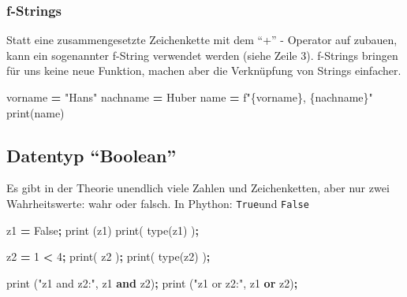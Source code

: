 \documentclass[
  oneside]{book}
\newenvironment{Shaded}{\begin{snugshade}}{\end{snugshade}}
\newcommand{\BuiltInTok}[1]{#1}
\newcommand{\DecValTok}[1]{\textcolor[rgb]{0.00,0.00,0.81}{#1}}
\newcommand{\KeywordTok}[1]{\textcolor[rgb]{0.13,0.29,0.53}{\textbf{#1}}}
\newcommand{\NormalTok}[1]{#1}
\newcommand{\OperatorTok}[1]{\textcolor[rgb]{0.81,0.36,0.00}{\textbf{#1}}}
\newcommand{\SpecialCharTok}[1]{\textcolor[rgb]{0.00,0.00,0.00}{#1}}
\newcommand{\SpecialStringTok}[1]{\textcolor[rgb]{0.31,0.60,0.02}{#1}}
\newcommand{\StringTok}[1]{\textcolor[rgb]{0.31,0.60,0.02}{#1}}
\newcommand{\VariableTok}[1]{\textcolor[rgb]{0.00,0.00,0.00}{#1}}
\begin{document}
\hypertarget{f-strings}{%
\subsubsection{f-Strings}\label{f-strings}}

Statt eine zusammengesetzte Zeichenkette mit dem ``+'' - Operator auf zubauen, kann ein sogenannter f-String verwendet werden (siehe Zeile 3). f-Strings bringen für uns keine neue Funktion, machen aber die Verknüpfung von Strings einfacher.

\begin{Shaded}
\begin{Highlighting}[]
\NormalTok{vorname }\OperatorTok{=} \StringTok{"Hans"}
\NormalTok{nachname }\OperatorTok{=} \StringTok{\textquotesingle{}Huber\textquotesingle{}}
\NormalTok{name }\OperatorTok{=} \SpecialStringTok{f"}\SpecialCharTok{\{}\NormalTok{vorname}\SpecialCharTok{\}}\SpecialStringTok{, }\SpecialCharTok{\{}\NormalTok{nachname}\SpecialCharTok{\}}\SpecialStringTok{"}
\BuiltInTok{print}\NormalTok{(name)}
\end{Highlighting}
\end{Shaded}

\hypertarget{datentyp-boolean}{%
\subsection{Datentyp ``Boolean''}\label{datentyp-boolean}}

Es gibt in der Theorie unendlich viele Zahlen und Zeichenketten, aber nur zwei Wahrheitswerte: wahr oder falsch. In Phython: \texttt{True}und \texttt{False}

\begin{Shaded}
\begin{Highlighting}[]
\NormalTok{z1 }\OperatorTok{=} \VariableTok{False}\OperatorTok{;}
\BuiltInTok{print}\NormalTok{ (z1)}
\BuiltInTok{print}\NormalTok{( }\BuiltInTok{type}\NormalTok{(z1) )}\OperatorTok{;}

\NormalTok{z2 }\OperatorTok{=} \DecValTok{1} \OperatorTok{\textless{}} \DecValTok{4}\OperatorTok{;}
\BuiltInTok{print}\NormalTok{( z2 )}\OperatorTok{;}
\BuiltInTok{print}\NormalTok{( }\BuiltInTok{type}\NormalTok{(z2) )}\OperatorTok{;}

\BuiltInTok{print}\NormalTok{ (}\StringTok{"z1 and z2:"}\NormalTok{, z1 }\KeywordTok{and}\NormalTok{ z2)}\OperatorTok{;}
\BuiltInTok{print}\NormalTok{ (}\StringTok{"z1 or z2:"}\NormalTok{, z1 }\KeywordTok{or}\NormalTok{ z2)}\OperatorTok{;}
\end{Highlighting}
\end{Shaded}
\end{document}
